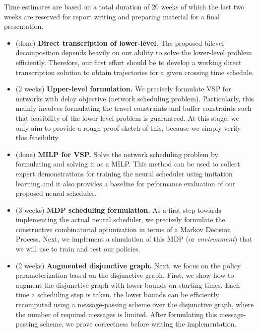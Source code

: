 \documentclass[notitlepage]{report}
\begin{document}
Time estimates are based on a total duration of 20 weeks of which the last two
weeks are reserved for report writing and preparing material for a final
presentation.

\begin{itemize}
  \item (done) \textbf{Direct transcription of lower-level.} The proposed bilevel
        decomposition depends heavily on our ability to solve the lower-level
        problem efficiently. Therefore, our first effort should be to develop a
        working direct transcription solution to obtain trajectories for a given
        crossing time schedule.

  \item (2 weeks) \textbf{Upper-level formulation.} We precisely formulate VSP for
        networks with delay objective (network scheduling problem).
        Particularly, this mainly involves formulating the travel constraints
        and buffer constraints such that feasibility of the lower-level problem
        is guaranteed. At this stage, we only aim to provide a rough proof
        sketch of this, because we simply verify this feasibility


  \item (done) \textbf{MILP for VSP.} Solve the network scheduling problem by formulating and
        solving it as a MILP. This method can be used to collect expert
        demonstrations for training the neural scheduler using imitation
        learning and it also provides a baseline for peformance evaluation of
        our proposed neural scheduler.

  \item (3 weeks) \textbf{MDP scheduling formulation.} As a first step towards implementing
        the actual neural scheduler, we precisely formulate the constructive
        combinatorial optimization in terms of a Markov Decision Process. Next,
        we implement a simulation of this MDP (or \textit{environment}) that we will
        use to train and test our policies.

  \item (2 weeks) \textbf{Augmented disjunctive graph.} Next, we focus on the policy
        parameterization based on the disjunctive graph. First, we show how to
        augment the disjunctive graph with lower bounds on starting times. Each
        time a scheduling step is taken, the lower bounds can be efficiently
        recomputed using a message-passing scheme over the disjunctive graph,
        where the number of required messages is limited. After formulating this
        message-passing scheme, we prove correctness before writing the
        implementation.


\end{itemize}
\end{document}
